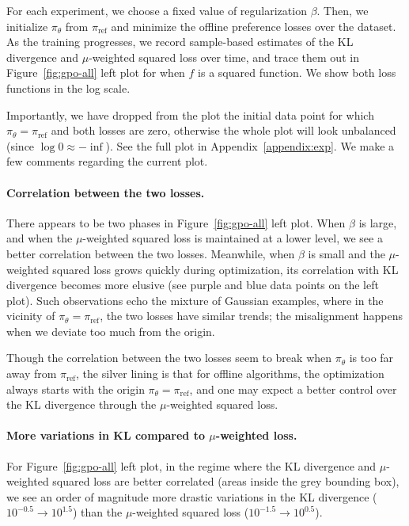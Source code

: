 For each experiment, we choose a fixed value of regularization $\beta$. Then, we initialize $\pi_\theta$ from $\pi_\text{ref}$ and minimize the offline preference losses over the dataset. As the training progresses, we record sample-based estimates of the KL divergence and $\mu$-weighted squared loss over time, and trace them out in Figure~\ref{fig:gpo-all} left plot for when $f$ is a squared function.  We show both loss functions in the log scale. 

Importantly, we have dropped from the plot the initial data point for which $\pi_\theta=\pi_\text{ref}$ and both losses are zero, otherwise the whole plot will look unbalanced (since $\log 0\approx -\inf$). See the full plot in Appendix~\ref{appendix:exp}. We make a few comments regarding the current plot.

\paragraph{Correlation between the two losses.} There appears to be two phases in Figure~\ref{fig:gpo-all} left plot. When $\beta$ is large, and when the $\mu$-weighted squared loss is maintained at a lower level, we see a better correlation between the two losses. Meanwhile, when $\beta$ is small and the $\mu$-weighted squared loss grows quickly during optimization, its correlation with KL divergence becomes more elusive (see purple and blue data points on the left plot). Such observations echo the mixture of Gaussian examples, where in the vicinity of $\pi_\theta=\pi_\text{ref}$, the two losses have similar trends; the misalignment happens when we deviate too much from the origin.

Though the correlation between the two losses seem to break when $\pi_\theta$ is too far away from $\pi_\text{ref}$, the silver lining is that for offline algorithms, the optimization always starts with the origin $\pi_\theta=\pi_\text{ref}$, and one may expect a better control over the KL divergence through the $\mu$-weighted squared loss.

\paragraph{More variations in KL compared to $\mu$-weighted loss.}
For Figure~\ref{fig:gpo-all} left plot, in the regime where the KL divergence and $\mu$-weighted squared loss are better correlated (areas inside the grey bounding box), we see an order of magnitude more drastic variations in the KL divergence ($10^{-0.5}\rightarrow 10^{1.5}$) than the $\mu$-weighted squared loss ($10^{-1.5} \rightarrow 10^{0.5}$). 

